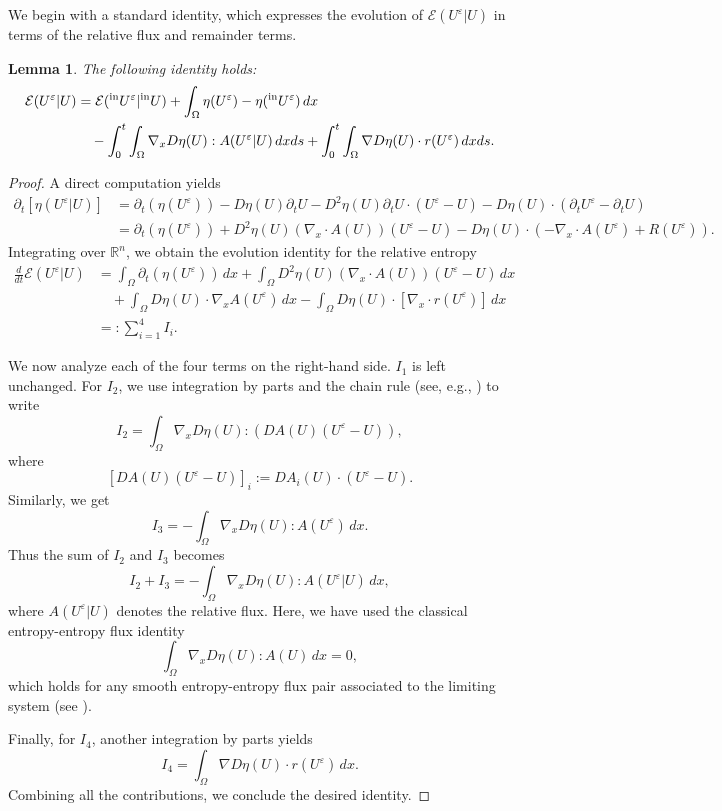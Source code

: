 \documentclass[10pt,reqno]{amsart}
\numberwithin{equation}{section}
\newtheorem{lemma}{Lemma}[section]
\newcommand{\calE}{\mathcal E}
\newcommand{\p}{\partial}
\newcommand{\ve}{\varepsilon}
\begin{document}
We begin with a standard identity, which expresses the evolution of $\calE(U^\ve|U)$ in terms of the relative flux and remainder terms.
\begin{lemma}
The following identity holds:
    \begin{equation} \label{eq: relent}
        \begin{split}
        \calE(U^\ve|U) &= \calE({}^{\rm in}U^\ve|{}^{\rm in}U) + \int_\Omega \eta(U^\ve) - \eta({}^{\rm in}U^\ve)\,dx \\
        &\quad - \int_0^t \int_\Omega \nabla_x D\eta(U): A(U^\ve|U)\,dx ds + \int_0^t \int_\Omega \nabla D\eta(U) \cdot r(U^\ve)\,dx ds.
    \end{split}
    \end{equation}
\end{lemma}
\begin{proof}
 A direct computation yields  
    \begin{align*}
        \p_t[\eta(U^\ve|U)] &= \p_t(\eta(U^\ve)) - D\eta(U) \p_t U - D^2\eta(U) \p_t U \cdot (U^\ve - U) - D\eta(U)\cdot (\p_t U^\ve - \p_t U) \\
        &= \p_t (\eta(U^\ve)) + D^2\eta(U) (\nabla_x\cdot A(U)) (U^\ve - U) - D\eta(U) \cdot (-\nabla_x\cdot A(U^\ve) + R(U^\ve)).
    \end{align*}
Integrating over $\mathbb{R}^n$, we obtain the evolution identity for the relative entropy
    \begin{align*}
        \frac{d}{dt}\calE(U^\ve|U) &= \int_\Omega \p_t(\eta(U^\ve)) \,dx   + \int_\Omega D^2\eta(U)(\nabla_x\cdot A(U))(U^\ve-U)\,dx\\
        &\quad + \int_\Omega D\eta(U)\cdot \nabla_x A(U^\ve)\,dx - \int_\Omega D\eta(U)\cdot [\nabla_x\cdot r(U^\ve)]\,dx \\
        &=: \sum_{i=1}^4 I_i.
    \end{align*}
    
    We now analyze each of the four terms on the right-hand side. $I_1$ is left unchanged. For $I_2$, we use integration by parts and the chain rule (see, e.g., \cite[Lemma 4.4]{KMT15}) to write        
\[
 I_2 = \int_\Omega \nabla_x D\eta(U) : (DA(U)(U^\ve - U)),
\]
    where
\[
        [DA(U)(U^\ve - U)]_i := D A_i(U) \cdot (U^\ve - U).
\]
    Similarly, we get
    \[
    I_3 = -\int_\Omega \nabla_x D\eta(U) : A(U^\ve)\,dx.
    \]
    Thus the sum of $I_2$ and $I_3$ becomes 
\[
        I_2 + I_3 = -\int_\Omega \nabla_x D\eta(U) : A(U^\ve | U) \,dx,
\]
    where $A(U^\ve | U)$ denotes the relative flux. Here, we have used the classical entropy-entropy flux identity
    \[
    \int_\Omega \nabla_x D\eta(U):A(U)\,dx = 0,
    \] 
which holds for any smooth entropy-entropy flux pair associated to the limiting system (see \cite[Eq. (4.14)]{KMT15}).
    
    Finally, for $I_4$, another integration by parts yields
\[
        I_4 = \int_\Omega \nabla D\eta(U) \cdot r(U^\ve) \,dx.
\]
Combining all the contributions, we conclude the desired identity. 
\end{proof}
\end{document}
